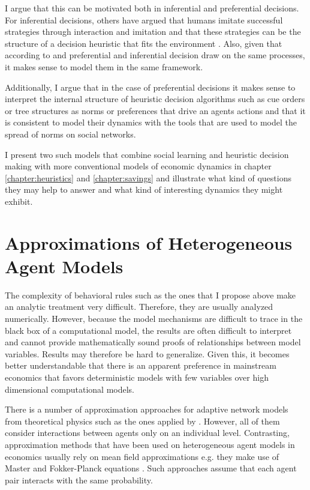 I argue that this can be motivated both in inferential and preferential decisions. For inferential decisions, others have argued that humans imitate successful strategies through interaction and imitation \citep{Bandura1971, Traulsen2010} and that these strategies can be the structure of a decision heuristic that fits the environment \citep{Garcia-Retamero2009}. Also, given that according to \cite{Weber2009} and \cite{Gigerenzer2011} preferential and inferential decision draw on the same processes, it makes sense to model them in the same framework. 

Additionally, I argue that in the case of preferential decisions it makes sense to interpret the internal structure of heuristic decision algorithms such as cue orders or tree structures as norms or preferences that drive an agents actions and that it is consistent to model their dynamics with the tools that are used to model the spread of norms on social networks.

I present two such models that combine social learning and heuristic decision making with more conventional models of economic dynamics in chapter \ref{chapter:heuristics} and \ref{chapter:savings} and illustrate what kind of questions they may help to answer and what kind of interesting dynamics they might exhibit.

\section{Approximations of Heterogeneous Agent Models}

The complexity of behavioral rules such as the ones that I propose above make an analytic treatment very difficult. Therefore, they are usually analyzed numerically. However, because the model mechanisms are difficult to trace in the black box of a computational model, the results are often difficult to interpret and cannot provide mathematically sound proofs of relationships between model variables. Results may therefore be hard to generalize. Given this, it becomes better understandable that there is an apparent preference in mainstream economics that favors deterministic models with few variables over high dimensional computational models.

There is a number of approximation approaches for adaptive network models from theoretical physics such as the ones applied by \cite{Rogers2013, Wiedermann2015, Min2017}. However, all of them consider interactions between agents only on an individual level. Contrasting, approximation methods that have been used on heterogeneous agent models in economics usually rely on mean field approximations e.g. they make use of Master and Fokker-Planck equations \citep{Aoki1998, Aoki2007, DelliGatti2000, DiGuilmi2008, Chiarella2011a, Landini2014}. Such approaches assume that each agent pair interacts with the same probability.

